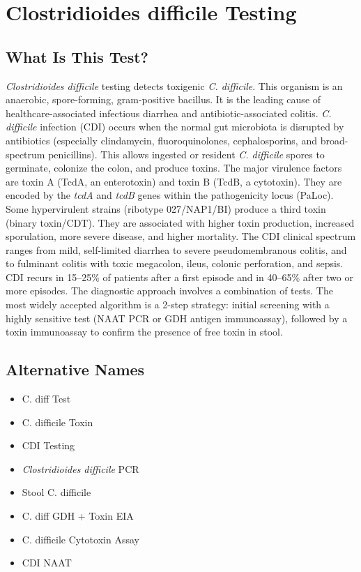 \chapter{Clostridioides difficile Testing}

\section*{What Is This Test?}
\textit{Clostridioides difficile} testing detects toxigenic \textit{C. difficile}. This organism is an anaerobic, spore-forming, gram-positive bacillus. It is the leading cause of healthcare-associated infectious diarrhea and antibiotic-associated colitis. \textit{C. difficile} infection (CDI) occurs when the normal gut microbiota is disrupted by antibiotics (especially clindamycin, fluoroquinolones, cephalosporins, and broad-spectrum penicillins). This allows ingested or resident \textit{C. difficile} spores to germinate, colonize the colon, and produce toxins. The major virulence factors are toxin A (TcdA, an enterotoxin) and toxin B (TcdB, a cytotoxin). They are encoded by the \textit{tcdA} and \textit{tcdB} genes within the pathogenicity locus (PaLoc). Some hypervirulent strains (ribotype 027/NAP1/BI) produce a third toxin (binary toxin/CDT). They are associated with higher toxin production, increased sporulation, more severe disease, and higher mortality. The CDI clinical spectrum ranges from mild, self-limited diarrhea to severe pseudomembranous colitis, and to fulminant colitis with toxic megacolon, ileus, colonic perforation, and sepsis. CDI recurs in 15--25\% of patients after a first episode and in 40--65\% after two or more episodes. The diagnostic approach involves a combination of tests. The most widely accepted algorithm is a 2-step strategy: initial screening with a highly sensitive test (NAAT PCR or GDH antigen immunoassay), followed by a toxin immunoassay to confirm the presence of free toxin in stool.

\section*{Alternative Names}
\begin{itemize}
  \item C. diff Test
  \item C. difficile Toxin
  \item CDI Testing
  \item \textit{Clostridioides difficile} PCR
  \item Stool C. difficile
  \item C. diff GDH + Toxin EIA
  \item C. difficile Cytotoxin Assay
  \item CDI NAAT
\end{itemize}
